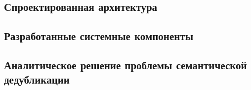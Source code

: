 \subsection{Спроектированная архитектура}
\label{sec:architecture}


\subsection{Разработанные системные компоненты}


\subsection{Аналитическое решение проблемы семантической дедубликации}

